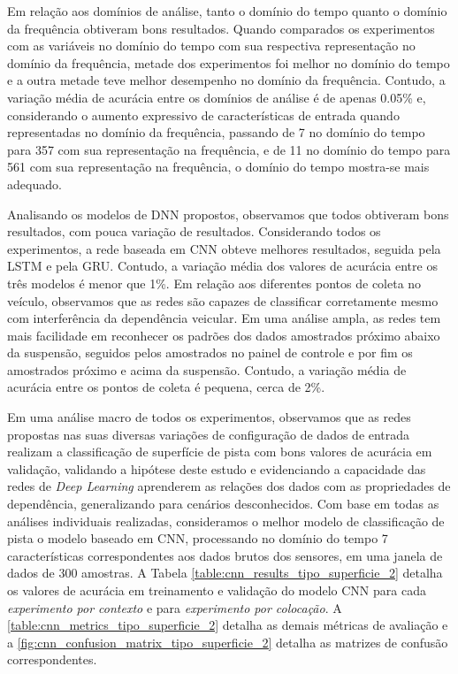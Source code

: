 Em relação aos domínios de análise, tanto o domínio do tempo quanto o domínio da frequência obtiveram bons resultados. Quando comparados os experimentos com as variáveis no domínio do tempo com sua respectiva representação no domínio da frequência, metade dos experimentos foi melhor no domínio do tempo e a outra metade teve melhor desempenho no domínio da frequência. Contudo, a variação média de acurácia entre os domínios de análise é de apenas 0.05\% e, considerando o aumento expressivo de características de entrada quando representadas no domínio da frequência, passando de 7 no domínio do tempo para 357 com sua representação na frequência, e de 11 no domínio do tempo para 561 com sua representação na frequência, o domínio do tempo mostra-se mais adequado.

Analisando os modelos de DNN propostos, observamos que todos obtiveram bons resultados, com pouca variação de resultados. Considerando todos os experimentos, a rede baseada em CNN obteve melhores resultados, seguida pela LSTM e pela GRU. Contudo, a variação média dos valores de acurácia entre os três modelos é menor que 1\%. Em relação aos diferentes pontos de coleta no veículo, observamos que as redes são capazes de classificar corretamente mesmo com interferência da dependência veicular. Em uma análise ampla, as redes tem mais facilidade em reconhecer os padrões dos dados amostrados próximo abaixo da suspensão, seguidos pelos amostrados no painel de controle e por fim os amostrados próximo e acima da suspensão. Contudo, a variação média de acurácia entre os pontos de coleta é pequena, cerca de 2\%.

Em uma análise macro de todos os experimentos, observamos que as redes propostas nas suas diversas variações de configuração de dados de entrada realizam a classificação de superfície de pista com bons valores de acurácia em validação, validando a hipótese deste estudo e evidenciando a capacidade das redes de \textit{Deep Learning} aprenderem as relações dos dados com as propriedades de dependência, generalizando para cenários desconhecidos. Com base em todas as análises individuais realizadas, consideramos o melhor modelo de classificação de pista o modelo baseado em CNN, processando no domínio do tempo 7 características correspondentes aos dados brutos dos sensores, em uma janela de dados de 300 amostras. A Tabela \ref{table:cnn_results_tipo_superficie_2} detalha os valores de acurácia em treinamento e validação do modelo CNN para cada \emph{experimento por contexto} e para \emph{experimento por colocação}. A \autoref{table:cnn_metrics_tipo_superficie_2} detalha as demais métricas de avaliação e a \autoref{fig:cnn_confusion_matrix_tipo_superficie_2} detalha as matrizes de confusão correspondentes.

